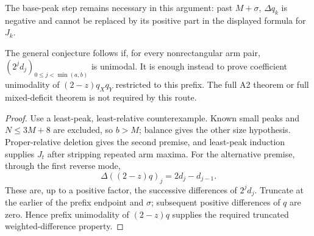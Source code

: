 The base-peak step remains necessary in this argument: past
$M+\sigma$, $\Delta q_k$ is negative and cannot be replaced by
its positive part in the displayed formula for $J_k$.

\begin{corollary}
The general conjecture follows if, for every nonrectangular
arm pair, $(2^jd_j)_{0\le j<\min(a,b)}$ is unimodal.
It is enough instead to prove coefficient unimodality of
$(2-z)q_Xq_Y$ restricted to this prefix. The full A2 theorem
or full mixed-deficit theorem is not required by this route.
\end{corollary}
\begin{proof}
Use a least-peak, least-relative counterexample. Known small
peaks and $N\le3M+8$ are excluded, so $b>M$; balance gives
the other size hypothesis. Proper-relative deletion gives the
second premise, and least-peak induction supplies $J_t$ after
stripping repeated arm maxima.
For the alternative premise, through the first reverse mode,
\[
 \Delta((2-z)q)_j=2d_j-d_{j-1}.
\]
These are, up to a positive factor, the successive differences
of $2^jd_j$. Truncate at the earlier of the prefix endpoint
and $\sigma$; subsequent positive differences of $q$ are zero.
Hence prefix unimodality of $(2-z)q$ supplies the required
truncated weighted-difference property.
\end{proof}

